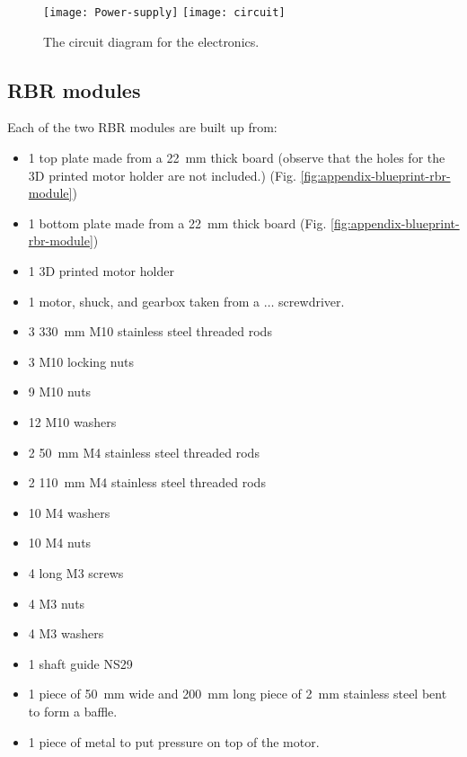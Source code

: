 \begin{figure}[htbp]
  \centering
  \texttt{[image: Power-supply]}
  \texttt{[image: circuit]}
  \caption{The circuit diagram for the electronics.}
  \label{fig:appendix-circuit-diagrams}
\end{figure}


\subsection{RBR modules}

Each of the two RBR modules are built up from:

\begin{itemize}
  \item 1 top plate made from a 22~mm thick board (observe that the holes for
    the 3D printed motor holder are not included.) (Fig. \ref{fig:appendix-blueprint-rbr-module})
  \item 1 bottom plate made from a 22~mm thick board (Fig. \ref{fig:appendix-blueprint-rbr-module})
  \item 1 3D printed motor holder
  \item 1 motor, shuck, and gearbox taken from a $\dots$
    screwdriver.
  \item 3 330~mm M10 stainless steel threaded rods
  \item 3 M10 locking nuts
  \item 9 M10 nuts
  \item 12 M10 washers
  \item 2 50~mm M4 stainless steel threaded rods
  \item 2 110~mm M4 stainless steel threaded rods
  \item 10 M4 washers
  \item 10 M4 nuts
  \item 4 long M3 screws
  \item 4 M3 nuts
  \item 4 M3 washers
  \item 1 shaft guide NS29
  \item 1 piece of 50~mm wide and 200~mm long piece of 2~mm stainless steel
    bent to form a baffle.
  \item 1 piece of metal to put pressure on top of the motor.
\end{itemize}


